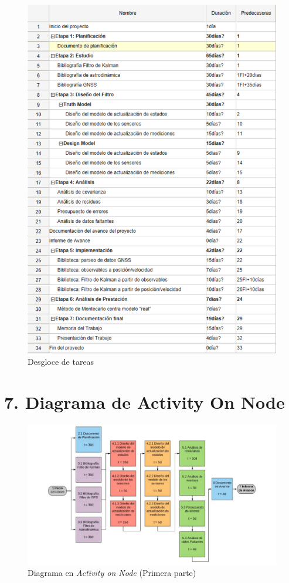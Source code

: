 \documentclass[11pt]{charter}
\begin{document}
\begin{figure}[H]
\centering 
\includegraphics[width=.7\textwidth]{./Figuras/WBS.pdf}
\caption{Desgloce de tareas}
\label{fig:wbs}
\end{figure}

\vspace{25px}

\section{7. Diagrama de Activity On Node}
\label{sec:AoN}

\begin{figure}[H]
\centering 
\includegraphics[page=1, width=\textwidth]{./Figuras/AoN.pdf}
\caption{Diagrama en \textit{Activity on Node} (Primera parte)}
\label{fig:AoN}
\end{figure}
\end{document}
